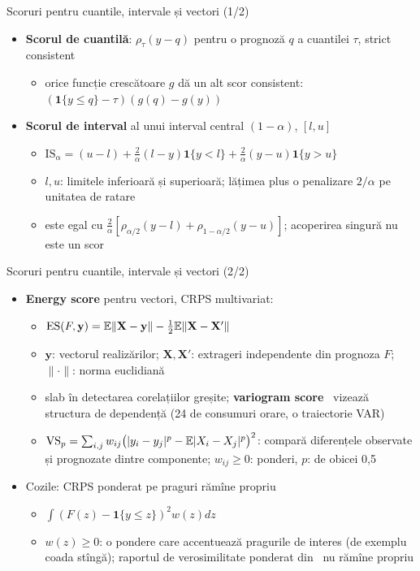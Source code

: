 \begin{frame}{Scoruri pentru cuantile, intervale și vectori (1/2)}
\itemsize{\small}
\begin{itemize}
    \item \textbf{Scorul de cuantilă}: $\rho_\tau(y - q)$ pentru o prognoză $q$ a cuantilei $\tau$, strict consistent 
    \begin{itemize}
        \item orice funcție crescătoare $g$ dă un alt scor consistent: $(\mathbf 1\{y \le q\} - \tau)(g(q) - g(y))$
    \end{itemize}
    \item \textbf{Scorul de interval} al unui interval central $(1 - \alpha)$, $[l, u]$ 
    \begin{itemize}
        \item $\mathrm{IS}_\alpha = (u - l) + \frac2\alpha(l - y)\mathbf 1\{y < l\} + \frac2\alpha(y - u)\mathbf 1\{y > u\}$
        \item $l, u$: limitele inferioară și superioară; lățimea plus o penalizare $2/\alpha$ pe unitatea de ratare
        \item este egal cu $\frac2\alpha[\rho_{\alpha/2}(y - l) + \rho_{1 - \alpha/2}(y - u)]$; acoperirea singură nu este un scor
    \end{itemize}
\end{itemize}
\end{frame}

\begin{frame}{Scoruri pentru cuantile, intervale și vectori (2/2)}
\itemsize{\small}
\begin{itemize}
    \item \textbf{Energy score} pentru vectori, CRPS multivariat:
    \begin{itemize}
        \item $\mathrm{ES}(F, \mathbf y) = \mathbb{E}\|\mathbf X - \mathbf y\| - \frac12\mathbb{E}\|\mathbf X - \mathbf X'\|$
        \item $\mathbf y$: vectorul realizărilor; $\mathbf X, \mathbf X'$: extrageri independente din prognoza $F$; $\|\cdot\|$: norma euclidiană
        \item slab în detectarea corelațiilor greșite; \textbf{variogram score} \ vizează structura de dependență (24 de consumuri orare, o traiectorie VAR)
        \item $\mathrm{VS}_p = \sum_{i,j}w_{ij}\big(|y_i - y_j|^p - \mathbb{E}|X_i - X_j|^p\big)^2$: compară diferențele observate și prognozate dintre componente; $w_{ij} \ge 0$: ponderi, $p$: de obicei 0,5
    \end{itemize}
    \item Cozile: CRPS ponderat pe praguri rămîne propriu 
    \begin{itemize}
        \item $\int (F(z) - \mathbf 1\{y \le z\})^2w(z)dz$
        \item $w(z) \ge 0$: o pondere care accentuează pragurile de interes (de exemplu coada stîngă); raportul de verosimilitate ponderat din \ nu rămîne propriu 
    \end{itemize}
\end{itemize}
\end{frame}

